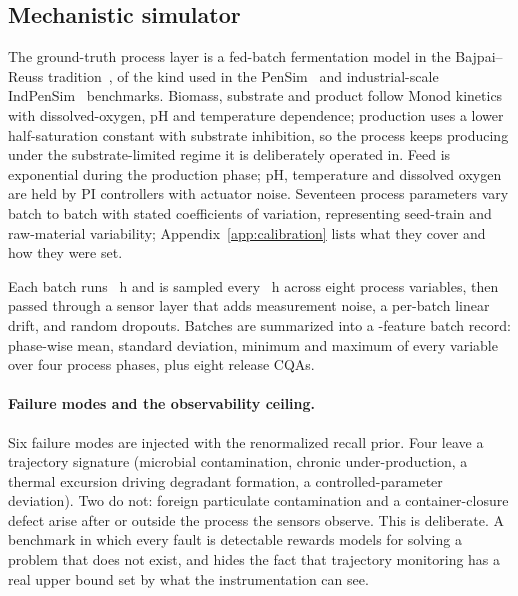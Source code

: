 \documentclass[11pt]{article}
\begin{document}
\subsection{Mechanistic simulator}
\label{sec:sim}

The ground-truth process layer is a fed-batch fermentation model in the
Bajpai--Reuss tradition~\citep{bajpai1980mechanistic}, of the kind used in the
PenSim~\citep{birol2002modular} and industrial-scale
IndPenSim~\citep{goldrick2015development,goldrick2019modern} benchmarks. Biomass,
substrate and product follow Monod kinetics with dissolved-oxygen, pH and
temperature dependence; production uses a lower half-saturation constant with
substrate inhibition, so the process keeps producing under the substrate-limited
regime it is deliberately operated in. Feed is exponential during the production
phase; pH, temperature and dissolved oxygen are held by PI controllers with
actuator noise. Seventeen process parameters vary batch to batch with stated
coefficients of variation, representing seed-train and raw-material variability;
Appendix~\ref{app:calibration} lists what they cover and how they were set.

Each batch runs \simDurationH{}~h and is sampled every \simSampleH{}~h across
eight process variables, then passed through a sensor layer that adds
measurement noise, a per-batch linear drift, and random dropouts. Batches are
summarized into a \simFeatures{}-feature batch record: phase-wise mean, standard
deviation, minimum and maximum of every variable over four process phases, plus
eight release CQAs.

\paragraph{Failure modes and the observability ceiling.}
Six failure modes are injected with the renormalized recall prior. Four leave a
trajectory signature (microbial contamination, chronic under-production, a
thermal excursion driving degradant formation, a controlled-parameter deviation).
Two do not: foreign particulate contamination and a container-closure defect
arise after or outside the process the sensors observe. This is deliberate. A
benchmark in which every fault is detectable rewards models for solving a problem
that does not exist, and hides the fact that trajectory monitoring has a real
upper bound set by what the instrumentation can see.
\end{document}
